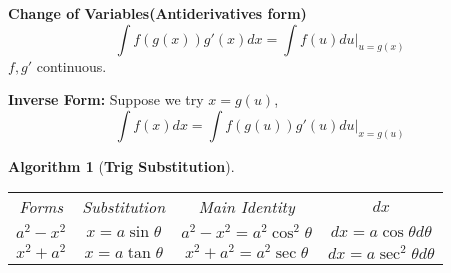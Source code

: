\documentclass[12pt]{article}
\theoremstyle{plain}
\newtheorem{algorithm}{Algorithm}[subsection]
\begin{document}
\textbf{Change of Variables(Antiderivatives form)}
\[
\int f(g(x))g'(x)dx = \int f(u) du \vert_{u=g(x)}
\]
$f, g'$ continuous.

\textbf{Inverse Form: }Suppose we try $x = g(u)$, 
\[
	\int f(x) dx = \int f(g(u))g'(u) du\vert_{x=g(u)}
\]

\begin{algorithm}[\textbf{Trig Substitution}]
	$ $
	\begin{center}
	\begin{tabular}{c c c c}
		Forms &  Substitution & Main Identity & $dx$ \\
		$a^2-x^2$ & $x = a\sin \theta$ & $a^2 - x^2 = a^2 \cos ^2 \theta$
				  & $dx = a\cos \theta d\theta$\\
		$x^2+a^2$ & $x = a\tan \theta$ & $x^2+a^2=a^2\sec\theta$
				  & $dx = a\sec^2\theta d\theta$
	\end{tabular}
	\end{center}
\end{algorithm}
\end{document}
